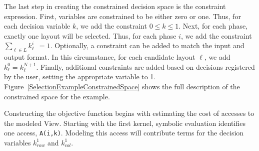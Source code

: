 The last step in creating the constrained decision space is the constraint expression. 
First, variables are constrained to be either zero or one. 
Thus, for each decision variable $k$, we add the constraint $0 \leq k \leq 1$.
Next, for each phase, exactly one layout will be selected. 
Thus, for each phase $i$, we add the constraint $\sum_{\ell \in L} k_\ell^{i} \ \ = 1$.
Optionally, a constraint can be added to match the input and output format.
In this circumstance, for each candidate layout $\ell$, we add $k_\ell^{0} = k_\ell^{N+1}$.
Finally, additional constraints are added based on decisions registered by the user, setting the appropriate variable to 1.
Figure~\ref{SelectionExampleConstrainedSpace} shows the full description of the constrained space for the example.


Constructing the objective function begins with estimating the cost of accesses to the modeled View.
Starting with the first kernel, symbolic evaluation identifies one access, \verb.A(i,k)..
Modeling this access will contribute terms for the decision variables $k_{row}^1$ and $k_{col}^1$.


